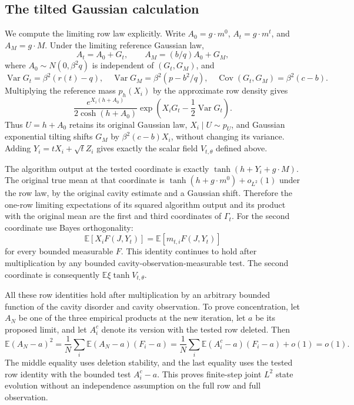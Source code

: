 \documentclass[11pt,reqno]{amsart}
\begin{document}
\subsection{The tilted Gaussian calculation}

We compute the limiting row law explicitly.
Write $A_0=g\cdot m^0$, $A_t=g\cdot m^t$, and $A_M=g\cdot M$.
Under the limiting reference Gaussian law,
\[
 A_t=A_0+G_t,\qquad A_M=(b/q)A_0+G_M,
\]
where $A_0\sim N(0,\beta^2q)$ is independent of $(G_t,G_M)$, and
\[
 \operatorname{Var}G_t=\beta^2(r(t)-q),\quad
 \operatorname{Var}G_M=\beta^2(p-b^2/q),\quad
 \operatorname{Cov}(G_t,G_M)=\beta^2(c-b).
\]
Multiplying the reference mass $p_h(X_i)$ by the approximate row density
gives
\[
 \frac{e^{X_i(h+A_0)}}{2\cosh(h+A_0)}
 \exp\left(X_iG_t-\frac12\operatorname{Var}G_t\right).
\]
Thus $U=h+A_0$ retains its original Gaussian law,
$X_i\mid U\sim p_U$, and Gaussian exponential tilting shifts $G_M$ by
$\beta^2(c-b)X_i$, without changing its variance.
Adding $Y_i=tX_i+\sqrt t Z_i$ gives exactly the scalar field
$V_{t,\theta}$ defined above.

The algorithm output at the tested coordinate is exactly
$\tanh(h+Y_i+g\cdot M)$.
The original true mean at that coordinate is
$\tanh(h+g\cdot m^0)+o_{L^2}(1)$ under the row law, by the original cavity
estimate and a Gaussian shift. Therefore the one-row limiting
expectations of its squared algorithm output and its product with the
original mean are the first and third coordinates of $\Gamma_t$.
For the second coordinate use Bayes orthogonality:
\[
 \mathbb E[X_iF(J,Y_t)]=\mathbb E[m_{t,i}F(J,Y_t)]
\]
for every bounded measurable $F$. This identity continues to hold after
multiplication by any bounded cavity-observation-measurable test.
The second coordinate is consequently $\mathbb E\xi\tanh V_{t,\theta}$.

All these row identities hold after multiplication by an arbitrary
bounded function of the cavity disorder and cavity observation.  To prove
concentration, let $A_N$ be one of the three empirical products at the
new iteration, let $a$ be its proposed limit, and let $A_i^c$ denote its
version with the tested row deleted.  Then
\[
 \mathbb E(A_N-a)^2
 =\frac1N\sum_i\mathbb E(A_N-a)(F_i-a)
 =\frac1N\sum_i\mathbb E(A_i^c-a)(F_i-a)+o(1)=o(1).
\]
The middle equality uses deletion stability, and the last equality uses
the tested row identity with the bounded test $A_i^c-a$.
This proves finite-step joint $L^2$ state evolution without an independence
assumption on the full row and full observation.
\end{document}
